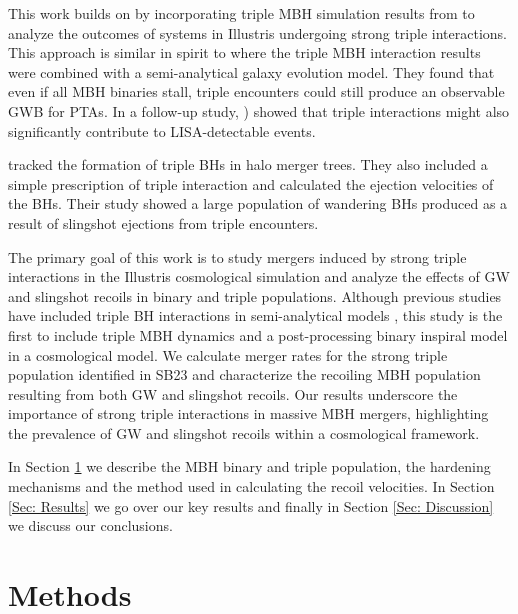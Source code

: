 \documentclass{book}
\begin{document}
This work builds on \citet{sayeb_mbh_2023} by incorporating triple MBH simulation results from \cite{bonetti_post-newtonian_2018-1} to analyze the outcomes of systems in Illustris undergoing strong triple interactions. This approach is similar in spirit to \cite{bonetti_post-newtonian_2018} where the triple MBH interaction results were combined with a semi-analytical galaxy evolution model. They found that even if all MBH binaries stall, triple encounters could still produce an observable GWB for PTAs. In a follow-up study, \citet{bonetti_post-newtonian_2019}) showed that triple interactions might also significantly contribute to LISA-detectable events. 

\citet{volonteri_assembly_2003} tracked the formation of triple BHs in halo merger trees. They also included a simple prescription of triple interaction and calculated the ejection velocities of the BHs. Their study showed a large population of wandering BHs produced as a result of slingshot ejections from triple encounters. 



The primary goal of this work is to study mergers induced by strong triple interactions in the Illustris cosmological simulation and analyze the effects of GW and slingshot recoils in binary and triple populations. Although previous studies have included triple BH interactions in semi-analytical models \citep{volonteri_assembly_2003,bonetti_post-newtonian_2018}, this study is the first to include triple MBH dynamics \citep{bonetti_post-newtonian_2018-1} and a post-processing binary inspiral model \citep{Kelley_2017a,sayeb_massive_2021} in a cosmological model. We calculate merger rates for the strong triple population identified in SB23 and characterize the recoiling MBH population resulting from both GW and slingshot recoils. Our results underscore the importance of strong triple interactions in massive MBH mergers, highlighting the prevalence of GW and slingshot recoils within a cosmological framework.

In Section \ref{sec: methods} we describe the MBH binary and triple population, the hardening mechanisms and the method used in calculating the recoil velocities. In Section \ref{Sec: Results} we go over our key results and finally in Section \ref{Sec: Discussion} we discuss our conclusions. 

\section{Methods}
\label{sec: methods}
\end{document}
